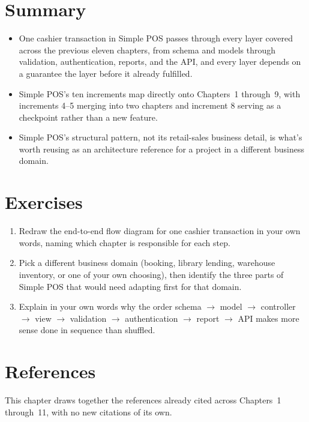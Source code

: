 
\section{Summary}
\label{sec:studi-kasus-menyeluruh-rangkuman}

\begin{itemize}
  \item One cashier transaction in Simple POS passes through every
    layer covered across the previous eleven chapters, from schema and
    models through validation, authentication, reports, and the API,
    and every layer depends on a guarantee the layer before it already
    fulfilled.
  \item Simple POS's ten increments map directly onto Chapters~1
    through~9, with increments 4--5 merging into two chapters and
    increment 8 serving as a checkpoint rather than a new feature.
  \item Simple POS's structural pattern, not its retail-sales business
    detail, is what's worth reusing as an architecture reference for a
    project in a different business domain.
\end{itemize}

\section{Exercises}

\begin{enumerate}
  \item Redraw the end-to-end flow diagram for one cashier transaction
    in your own words, naming which chapter is responsible for each
    step.
  \item Pick a different business domain (booking, library lending,
    warehouse inventory, or one of your own choosing), then identify
    the three parts of Simple POS that would need adapting first for
    that domain.
  \item Explain in your own words why the order schema $\to$ model
    $\to$ controller $\to$ view $\to$ validation $\to$ authentication
    $\to$ report $\to$ API makes more sense done in sequence than
    shuffled.
\end{enumerate}

\section{References}

This chapter draws together the references already cited across
Chapters~1 through~11, with no new citations of its own.
